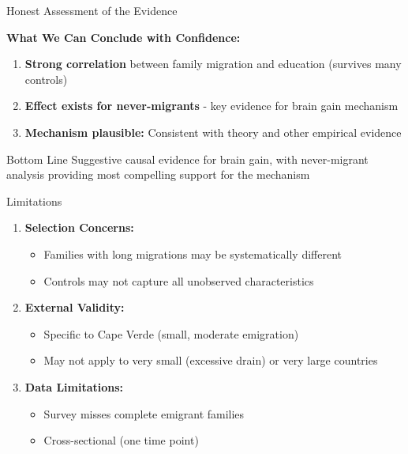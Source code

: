 \documentclass{beamer}
\begin{document}
\begin{frame}{Honest Assessment of the Evidence}

\textbf{What We Can Conclude with Confidence:}
\begin{enumerate}
    \item \textbf{Strong correlation} between family migration and education (survives many controls)
    \item \textbf{Effect exists for never-migrants} - key evidence for brain gain mechanism
    \item \textbf{Mechanism plausible:} Consistent with theory and other empirical evidence
\end{enumerate}

\vspace{0.2cm}
\begin{alertblock}{Bottom Line}
Suggestive causal evidence for brain gain, with never-migrant analysis providing most compelling support for the mechanism
\end{alertblock}
\end{frame}

\begin{frame}{Limitations}

\begin{enumerate}
    \item \textbf{Selection Concerns:}
    \begin{itemize}
        \item Families with long migrations may be systematically different
        \item Controls may not capture all unobserved characteristics
    \end{itemize}
    
   \item \textbf{External Validity:}
\begin{itemize}
    \item Specific to Cape Verde (small, moderate emigration)
    \item May not apply to very small (excessive drain) or very large countries
\end{itemize}
    
    \item \textbf{Data Limitations:}
    \begin{itemize}
        \item Survey misses complete emigrant families
        \item Cross-sectional (one time point)
    \end{itemize}
\end{enumerate}
\end{frame}
\end{document}
